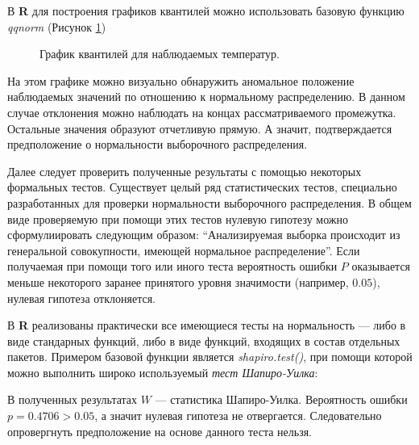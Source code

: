 В \textbf{R} для построения графиков квантилей можно использовать базовую функцию \textit{qqnorm} (Рисунок \ref{img:qqnorm})
\begin{figure}[ht]
\caption{График квантилей для наблюдаемых температур.}
\label{img:qqnorm}
\end{figure}
На этом графике можно визуально обнаружить аномальное положение наблюдаемых значений по отношению к нормальному распределению. В данном случае отклонения можно наблюдать на концах рассматриваемого промежутка. Остальные значения образуют отчетливую прямую. А значит, подтверждается предположение о нормальности выборочного распределения.

Далее следует проверить полученные результаты с помощью некоторых формальных тестов. Существует целый ряд статистических тестов, специально разработанных для проверки нормальности выборочного распределения. В общем виде проверяемую при помощи этих тестов нулевую гипотезу можно сформулиировать следующим образом: ``Анализируемая выборка происходит из генеральной совокупности, имеющей нормальное распределение''. Если получаемая при помощи того или иного теста вероятность ошибки $P$ оказывается меньше некоторого заранее принятого уровня значимости (например, $0.05$), нулевая гипотеза отклоняется.

В \textbf{R} реализованы практически все имеющиеся тесты на нормальность --- либо в виде стандарных функций, либо в виде функций, входящих в состав отдельных пакетов. Примером базовой функции является \textit{shapiro.test()}, при помощи которой можно выполнить широко используемый \textit{тест Шапиро-Уилка}:

В полученных результатах $W$ --- статистика Шапиро-Уилка. Вероятность ошибки $p = 0.4706 > 0.05$, а значит нулевая гипотеза не отвергается. Следовательно опровергнуть предположение на основе данного теста нельзя.

